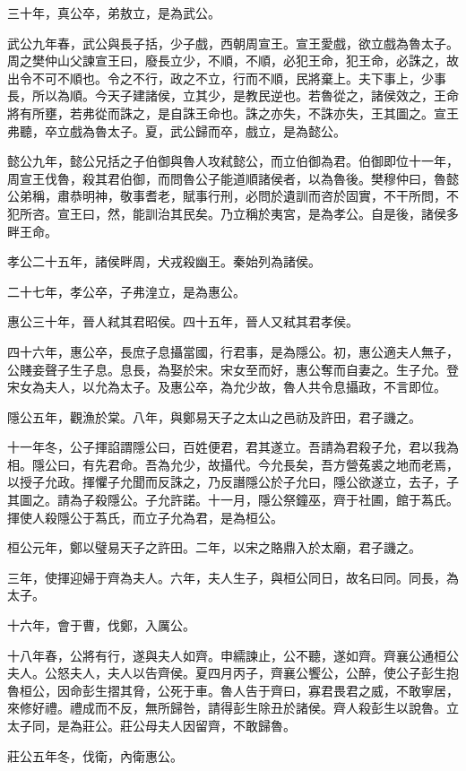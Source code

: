 三十年，真公卒，弟敖立，是為武公。

武公九年春，武公與長子括，少子戲，西朝周宣王。宣王愛戲，欲立戲為魯太子。周之樊仲山父諫宣王曰，廢長立少，不順，不順，必犯王命，犯王命，必誅之，故出令不可不順也。令之不行，政之不立，行而不順，民將棄上。夫下事上，少事長，所以為順。今天子建諸侯，立其少，是教民逆也。若魯從之，諸侯效之，王命將有所壅，若弗從而誅之，是自誅王命也。誅之亦失，不誅亦失，王其圖之。宣王弗聽，卒立戲為魯太子。夏，武公歸而卒，戲立，是為懿公。

懿公九年，懿公兄括之子伯御與魯人攻弒懿公，而立伯御為君。伯御即位十一年，周宣王伐魯，殺其君伯御，而問魯公子能道順諸侯者，以為魯後。樊穆仲曰，魯懿公弟稱，肅恭明神，敬事耆老，賦事行刑，必問於遺訓而咨於固實，不干所問，不犯所咨。宣王曰，然，能訓治其民矣。乃立稱於夷宮，是為孝公。自是後，諸侯多畔王命。

孝公二十五年，諸侯畔周，犬戎殺幽王。秦始列為諸侯。

二十七年，孝公卒，子弗湟立，是為惠公。

惠公三十年，晉人弒其君昭侯。四十五年，晉人又弒其君孝侯。

四十六年，惠公卒，長庶子息攝當國，行君事，是為隱公。初，惠公適夫人無子，公賤妾聲子生子息。息長，為娶於宋。宋女至而好，惠公奪而自妻之。生子允。登宋女為夫人，以允為太子。及惠公卒，為允少故，魯人共令息攝政，不言即位。

隱公五年，觀漁於棠。八年，與鄭易天子之太山之邑祊及許田，君子譏之。

十一年冬，公子揮諂謂隱公曰，百姓便君，君其遂立。吾請為君殺子允，君以我為相。隱公曰，有先君命。吾為允少，故攝代。今允長矣，吾方營菟裘之地而老焉，以授子允政。揮懼子允聞而反誅之，乃反譖隱公於子允曰，隱公欲遂立，去子，子其圖之。請為子殺隱公。子允許諾。十一月，隱公祭鐘巫，齊于社圃，館于蒍氏。揮使人殺隱公于蒍氏，而立子允為君，是為桓公。

桓公元年，鄭以璧易天子之許田。二年，以宋之賂鼎入於太廟，君子譏之。

三年，使揮迎婦于齊為夫人。六年，夫人生子，與桓公同日，故名曰同。同長，為太子。

十六年，會于曹，伐鄭，入厲公。

十八年春，公將有行，遂與夫人如齊。申繻諫止，公不聽，遂如齊。齊襄公通桓公夫人。公怒夫人，夫人以告齊侯。夏四月丙子，齊襄公饗公，公醉，使公子彭生抱魯桓公，因命彭生摺其脅，公死于車。魯人告于齊曰，寡君畏君之威，不敢寧居，來修好禮。禮成而不反，無所歸咎，請得彭生除丑於諸侯。齊人殺彭生以說魯。立太子同，是為莊公。莊公母夫人因留齊，不敢歸魯。

莊公五年冬，伐衛，內衛惠公。

